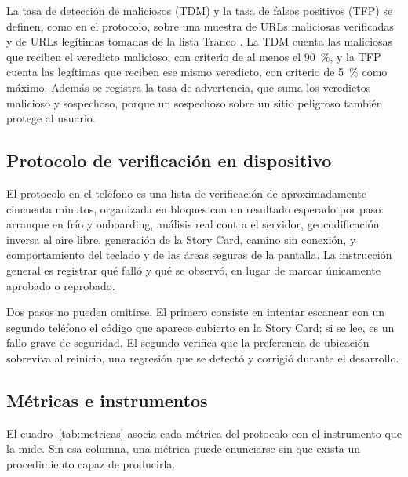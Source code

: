La tasa de detección de maliciosos (TDM) y la tasa de falsos positivos (TFP) se definen, como en el protocolo, sobre una muestra de URLs maliciosas verificadas y de URLs legítimas tomadas de la lista Tranco \cite{lepochat2019tranco}. La TDM cuenta las maliciosas que reciben el veredicto malicioso, con criterio de al menos el 90~\%, y la TFP cuenta las legítimas que reciben ese mismo veredicto, con criterio de 5~\% como máximo. Además se registra la tasa de advertencia, que suma los veredictos malicioso y sospechoso, porque un sospechoso sobre un sitio peligroso también protege al usuario.

\subsection{Protocolo de verificación en dispositivo}

El protocolo en el teléfono es una lista de verificación de aproximadamente cincuenta minutos, organizada en bloques con un resultado esperado por paso: arranque en frío y onboarding, análisis real contra el servidor, geocodificación inversa al aire libre, generación de la Story Card, camino sin conexión, y comportamiento del teclado y de las áreas seguras de la pantalla. La instrucción general es registrar qué falló y qué se observó, en lugar de marcar únicamente aprobado o reprobado.

Dos pasos no pueden omitirse. El primero consiste en intentar escanear con un segundo teléfono el código que aparece cubierto en la Story Card; si se lee, es un fallo grave de seguridad. El segundo verifica que la preferencia de ubicación sobreviva al reinicio, una regresión que se detectó y corrigió durante el desarrollo.

\subsection{Métricas e instrumentos}

El cuadro~\ref{tab:metricas} asocia cada métrica del protocolo con el instrumento que la mide. Sin esa columna, una métrica puede enunciarse sin que exista un procedimiento capaz de producirla.

